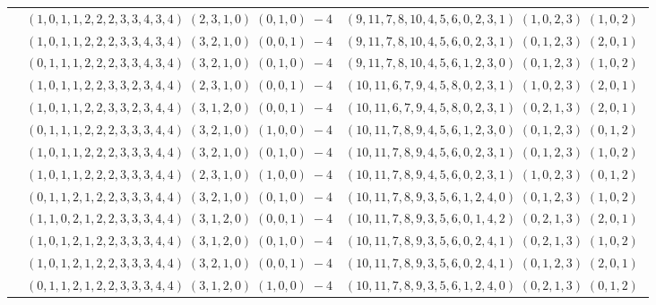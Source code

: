 \documentclass[11pt]{article}
\begin{document}
\begin{longtable}[l]{|c|c|c|}
 \cline{2-3} 
 & $(1 ,0 ,1 ,1 ,2 ,2 ,2 ,3 ,3 ,4 ,3 ,4) \;(2 ,3 ,1 ,0) \;(0 ,1 ,0) \;-4$ & $(9 ,11 ,7 ,8 ,10 ,4 ,5 ,6 ,0 ,2 ,3 ,1) \;(1 ,0 ,2 ,3) \;(1 ,0 ,2) \;$\\ 
 \cline{2-3} 
 & $(1 ,0 ,1 ,1 ,2 ,2 ,2 ,3 ,3 ,4 ,3 ,4) \;(3 ,2 ,1 ,0) \;(0 ,0 ,1) \;-4$ & $(9 ,11 ,7 ,8 ,10 ,4 ,5 ,6 ,0 ,2 ,3 ,1) \;(0 ,1 ,2 ,3) \;(2 ,0 ,1) \;$\\ 
 \cline{2-3} 
 & $(0 ,1 ,1 ,1 ,2 ,2 ,2 ,3 ,3 ,4 ,3 ,4) \;(3 ,2 ,1 ,0) \;(0 ,1 ,0) \;-4$ & $(9 ,11 ,7 ,8 ,10 ,4 ,5 ,6 ,1 ,2 ,3 ,0) \;(0 ,1 ,2 ,3) \;(1 ,0 ,2) \;$\\ 
 \cline{2-3} 
 & $(1 ,0 ,1 ,1 ,2 ,2 ,3 ,3 ,2 ,3 ,4 ,4) \;(2 ,3 ,1 ,0) \;(0 ,0 ,1) \;-4$ & $(10 ,11 ,6 ,7 ,9 ,4 ,5 ,8 ,0 ,2 ,3 ,1) \;(1 ,0 ,2 ,3) \;(2 ,0 ,1) \;$\\ 
 \cline{2-3} 
 & $(1 ,0 ,1 ,1 ,2 ,2 ,3 ,3 ,2 ,3 ,4 ,4) \;(3 ,1 ,2 ,0) \;(0 ,0 ,1) \;-4$ & $(10 ,11 ,6 ,7 ,9 ,4 ,5 ,8 ,0 ,2 ,3 ,1) \;(0 ,2 ,1 ,3) \;(2 ,0 ,1) \;$\\ 
 \cline{2-3} 
 & $(0 ,1 ,1 ,1 ,2 ,2 ,2 ,3 ,3 ,3 ,4 ,4) \;(3 ,2 ,1 ,0) \;(1 ,0 ,0) \;-4$ & $(10 ,11 ,7 ,8 ,9 ,4 ,5 ,6 ,1 ,2 ,3 ,0) \;(0 ,1 ,2 ,3) \;(0 ,1 ,2) \;$\\ 
 \cline{2-3} 
 & $(1 ,0 ,1 ,1 ,2 ,2 ,2 ,3 ,3 ,3 ,4 ,4) \;(3 ,2 ,1 ,0) \;(0 ,1 ,0) \;-4$ & $(10 ,11 ,7 ,8 ,9 ,4 ,5 ,6 ,0 ,2 ,3 ,1) \;(0 ,1 ,2 ,3) \;(1 ,0 ,2) \;$\\ 
 \cline{2-3} 
 & $(1 ,0 ,1 ,1 ,2 ,2 ,2 ,3 ,3 ,3 ,4 ,4) \;(2 ,3 ,1 ,0) \;(1 ,0 ,0) \;-4$ & $(10 ,11 ,7 ,8 ,9 ,4 ,5 ,6 ,0 ,2 ,3 ,1) \;(1 ,0 ,2 ,3) \;(0 ,1 ,2) \;$\\ 
 \cline{2-3} 
 & $(0 ,1 ,1 ,2 ,1 ,2 ,2 ,3 ,3 ,3 ,4 ,4) \;(3 ,2 ,1 ,0) \;(0 ,1 ,0) \;-4$ & $(10 ,11 ,7 ,8 ,9 ,3 ,5 ,6 ,1 ,2 ,4 ,0) \;(0 ,1 ,2 ,3) \;(1 ,0 ,2) \;$\\ 
 \cline{2-3} 
 & $(1 ,1 ,0 ,2 ,1 ,2 ,2 ,3 ,3 ,3 ,4 ,4) \;(3 ,1 ,2 ,0) \;(0 ,0 ,1) \;-4$ & $(10 ,11 ,7 ,8 ,9 ,3 ,5 ,6 ,0 ,1 ,4 ,2) \;(0 ,2 ,1 ,3) \;(2 ,0 ,1) \;$\\ 
 \cline{2-3} 
 & $(1 ,0 ,1 ,2 ,1 ,2 ,2 ,3 ,3 ,3 ,4 ,4) \;(3 ,1 ,2 ,0) \;(0 ,1 ,0) \;-4$ & $(10 ,11 ,7 ,8 ,9 ,3 ,5 ,6 ,0 ,2 ,4 ,1) \;(0 ,2 ,1 ,3) \;(1 ,0 ,2) \;$\\ 
 \cline{2-3} 
 & $(1 ,0 ,1 ,2 ,1 ,2 ,2 ,3 ,3 ,3 ,4 ,4) \;(3 ,2 ,1 ,0) \;(0 ,0 ,1) \;-4$ & $(10 ,11 ,7 ,8 ,9 ,3 ,5 ,6 ,0 ,2 ,4 ,1) \;(0 ,1 ,2 ,3) \;(2 ,0 ,1) \;$\\ 
 \cline{2-3} 
 & $(0 ,1 ,1 ,2 ,1 ,2 ,2 ,3 ,3 ,3 ,4 ,4) \;(3 ,1 ,2 ,0) \;(1 ,0 ,0) \;-4$ & $(10 ,11 ,7 ,8 ,9 ,3 ,5 ,6 ,1 ,2 ,4 ,0) \;(0 ,2 ,1 ,3) \;(0 ,1 ,2) \;$\\ 

\end{longtable}
\end{document}

